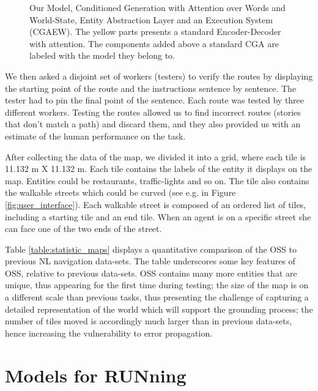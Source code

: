 \documentclass[11pt,a4paper]{article}
\begin{document}
\begin{figure*}[t]
\centering
{}
 \caption{Our Model, Conditioned Generation with Attention over Words and World-State, Entity Abstraction Layer and an Execution System (CGAEW). The yellow parts presents a standard Encoder-Decoder with attention. The components added above a standard CGA are labeled with the model they belong to.}
\label{fig:model}
\end{figure*}




We then asked a disjoint set of workers (testers) to verify the routes by displaying the starting point of the route and the instructions sentence by sentence. The tester had to pin the final point of the sentence. Each route was tested by three different workers. Testing the routes allowed us to find incorrect routes (stories that don't match a path) and discard them, and they also   provided us with an estimate of  the human performance on the  task.  %


After collecting the data of the map, we divided it into a grid, where each tile is 11.132 m X 11.132 m. Each tile contains the labels of the entity it displays on the map. Entities could be restaurants, traffic-lights and so on. The tile also contains the walkable streets which could be curved (see e.g. in Figure \ref{fig:user_interface}). Each walkable street is composed of an ordered list of tiles, including a starting tile and an end tile. When an agent is on a specific street she can face one of the two ends of the street. 




 Table \ref{table:statistic_maps} displays a quantitative comparison of the OSS to previous NL navigation data-sets.  
 The table underscores some key features of OSS, relative to previous data-sets.
 OSS contains many more entities that are unique, thus appearing for the first time during testing; the size of the map is on a different scale than previous tasks, thus presenting the challenge of capturing a detailed representation of the world which will support the grounding process; the number of tiles moved is accordingly much larger than in previous data-sets, hence increasing the vulnerability to error propagation.




\section{Models for RUNning}
\label{models}
\end{document}
